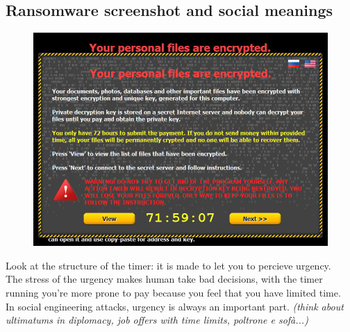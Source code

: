         \subsection{Ransomware screenshot and social meanings}
            \begin{figure}[ht!]
                \centering
                \includegraphics[width=0.40\linewidth]{ransomware_screen.png}
            \end{figure}
            Look at the structure of the timer: it is made to let you to percieve urgency.\\
            The stress of the urgency makes human take bad decisions, with the timer running you're more prone to pay because you feel that you have limited time.\\
            In social engineering attacks, urgency is always an important part. \textit{(think about ultimatums in diplomacy, job offers with time limits, poltrone e sofà...)}
